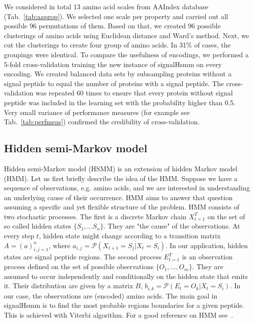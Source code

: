 \documentclass[10pt,letterpaper]{article}
\begin{document}
We considered in total 13 amino acid scales from AAIndex database~\cite{2008kawashimaaaindex} (Tab.~\ref{tab:aaprop}). We selected one scale per property and carried out all possible 96 permutations of them. Based on that, we created 96 possible clusterings of amino acids using Euclidean distance and Ward's method. Next, we cut the clusterings to create four group of amino acids. In 31\% of cases, the groupings were identical. To compare the usefulness of encodings, we performed a 5-fold cross-validation training the new instance of signalHsmm on every encoding. We created balanced data sets by subsampling proteins without a signal peptide to equal the number of proteins with a signal peptide. The cross-validation was repeated 60 times to ensure that every protein without signal peptide was included in the learning set with the probability higher than 0.5. Very small variance of performance measures (for example see Tab.~\ref{tab:perfmeas})  confirmed the credibility of cross-validation.

\subsection*{Hidden semi-Markov model}
Hidden semi-Markov model (HSMM) is an extension of hidden Markov model (HMM). 
Let us first briefly describe the idea of the HMM. 
Suppose we have a sequence of observations, e.g. amino acids, and we are interested in understanding an underlying cause of their occurrence. 
HMM aims to answer that question assuming a specific and yet flexible structure of the problem.
HMM consists of two stochastic processes. The first is a discrete Markov chain $X_{t=1}^T$ on the set of so called hidden states $\{S_1, \dots S_n\}$.
They are "the cause" of the observations. At every step $t$, hidden state might change according to a transition matrix
$A= (a)_{i,j=1}^n$, where $a_{i,j} = \mathcal{P}(X_{t+1} = S_j | X_t = S_i)$. In our application, hidden states are signal peptide regions.
The second process $E_{t=1}^T$ is an observation process defined on the set of possible observations $\{O_1, \dots, O_m\}$. They are assumed to occur independently and conditionally on the hidden state that emits it. 
Their distribution are given by a matrix $B$, $b_{i,k} = \mathcal{P}(E_t = O_k | X_t = S_i)$.
In our case, the observations are (encoded) amino acids.
The main goal in signalHsmm is to find the most probable regions boundaries for a given peptide. This is achieved with Viterbi algorithm.
For a good reference on HMM see~\cite{1989rabinera}.
\end{document}
